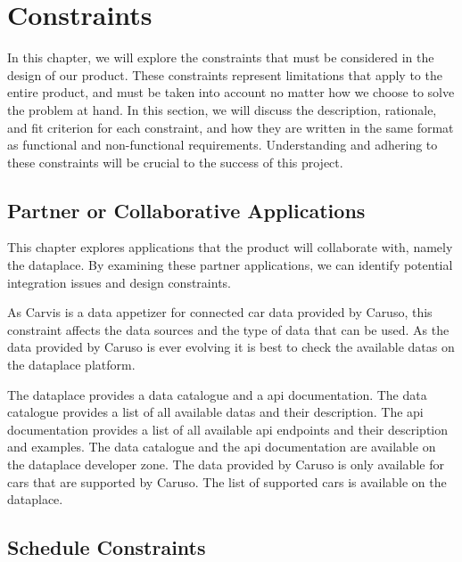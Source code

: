 \chapter{Constraints}

In this chapter, we will explore the constraints that must be considered in the design of our product. These constraints represent limitations that apply to the entire product, and must be taken into account no matter how we choose to solve the problem at hand. In this section, we will discuss the description, rationale, and fit criterion for each constraint, and how they are written in the same format as functional and non-functional requirements. Understanding and adhering to these constraints will be crucial to the success of this project.

\section{Partner or Collaborative Applications}

This chapter explores applications that the product will collaborate with, namely the \gls{dataplace}. By examining these partner applications, we can identify potential integration issues and design constraints.

As Carvis is a data appetizer for connected car data provided by Caruso, this constraint affects the data sources and the type of data that can be used. As the data provided by Caruso is ever evolving it is best to check the available \glspl{data} on the \gls{dataplace} platform. 

The \gls{dataplace} provides a data catalogue and a \gls{api} documentation. The data catalogue provides a list of all available \glspl{data} and their description. The \gls{api} documentation provides a list of all available \gls{api} endpoints and their description and examples. The data catalogue and the \gls{api} documentation are available on the \gls{dataplace} developer zone. The data provided by Caruso is only available for cars that are supported by Caruso. The list of supported cars is available on the \gls{dataplace}.

\section{Schedule Constraints}

